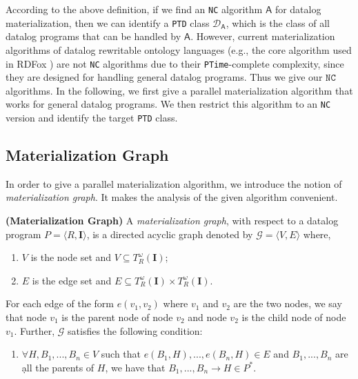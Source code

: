 \documentclass[final,1p,times]{elsarticle}
\begin{document}
According to the above definition, if we find an \texttt{NC} algorithm $\mathsf{A}$
for datalog materialization, then we can identify a \texttt{PTD} class $\mathcal{D}_{\mathsf{A}}$,
which is the class of all datalog programs that can be handled by $\mathsf{A}$.
However, current materialization algorithms of datalog rewritable ontology languages
(e.g., the core algorithm used in RDFox \cite{MotikNPHO14}) are not \texttt{NC} algorithms
due to their \texttt{PTime}-complete complexity, since they are designed for handling general datalog programs.
Thus we give our $\texttt{NC}$ algorithms.
In the following, we first give a parallel materialization algorithm that works for
general datalog programs. We then restrict this algorithm to an \texttt{NC} version
and identify the target \texttt{PTD} class.


\subsection{Materialization Graph}

In order to give a parallel materialization algorithm,
we introduce the notion of \emph{materialization graph}.
It makes the analysis of the given algorithm convenient.

\begin{definition}
\textbf{(Materialization Graph)}\label{def:mg}
A \emph{materialization graph}, with respect to
a datalog program $P=\langle R, \textbf{I}\rangle$, is a directed acyclic graph
denoted by $\mathcal{G}=\langle V, E\rangle$ where,
\begin{enumerate}[leftmargin=4ex,label=$\bullet$]
  \item $V$ is the node set and $V\subseteq T_R^{\omega}(\textbf{I})$;
  \item $E$ is the edge set and $E\subseteq T_R^{\omega}(\textbf{I})\times T_R^{\omega}(\textbf{I})$.
\end{enumerate}
For each edge of the form $e(v_1, v_2)$ where $v_1$ and $v_2$ are the two nodes,
we say that node $v_1$ is the parent node of node $v_2$ and node $v_2$ is the child node
of node $v_1$. Further, $\mathcal{G}$ satisfies the following condition:
\begin{enumerate}[leftmargin=4ex,label=$\bullet$]
  \item $\forall H,B_1,...,B_n\in V$ such that $e(B_1, H),...,e(B_n, H)\in E$ and
  $B_1,...,B_n$ are \d{all} the parents of $H$, we have that
  $B_1,...,B_n\rightarrow H\in P^*$.
\end{enumerate}
\end{definition}
\end{document}

